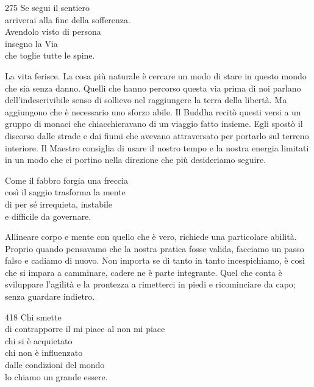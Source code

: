
\begin{dhpVerse}{275}
\label{dhp-275}
Se segui il sentiero\\
arriverai alla fine della sofferenza.\\
Avendolo visto di persona\\
insegno la Via\\
che toglie tutte le spine.
\end{dhpVerse}

\begin{dhpRefl}
  La vita ferisce. La cosa più naturale è cercare un modo di stare in questo
  mondo che sia senza danno. Quelli che hanno percorso questa via prima di noi
  parlano dell'indescrivibile senso di sollievo nel raggiungere la terra della
  libertà. Ma aggiungono che è necessario uno sforzo abile. Il Buddha recitò
  questi versi a un gruppo di monaci che chiacchieravano di un viaggio fatto
  insieme. Egli spostò il discorso dalle strade e dai fiumi che avevano
  attraversato per portarlo sul terreno interiore. Il Maestro consiglia di usare
  il nostro tempo e la nostra energia limitati in un modo che ci portino nella
  direzione che più desideriamo seguire.
\end{dhpRefl}


\begin{dhpVerse}{33}
\label{dhp-33}
Come il fabbro forgia una freccia\\
così il saggio trasforma la mente\\
di per sé irrequieta, instabile\\
e difficile da governare.
\end{dhpVerse}

\begin{dhpRefl}
  Allineare corpo e mente con quello che è vero, richiede una particolare
  abilità. Proprio quando pensavamo che la nostra pratica fosse valida, facciamo
  un passo falso e cadiamo di nuovo. Non importa se di tanto in tanto
  incespichiamo, è così che si impara a camminare, cadere ne è parte integrante.
  Quel che conta è sviluppare l'agilità e la prontezza a rimetterci in piedi e
  ricominciare da capo; senza guardare indietro.
\end{dhpRefl}


\begin{dhpVerse}{418}
\label{dhp-418}
Chi smette\\
di contrapporre il mi piace al non mi piace\\
chi si è acquietato\\
chi non è influenzato\\
dalle condizioni del mondo\\
lo chiamo un grande essere.
\end{dhpVerse}

